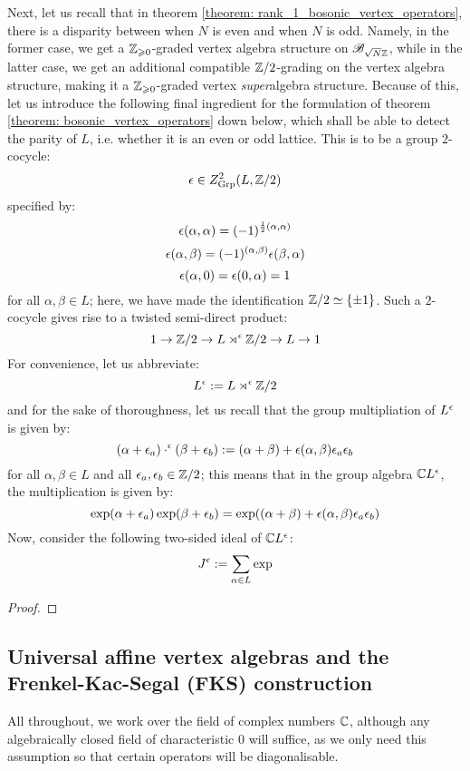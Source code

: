         Next, let us recall that in theorem \ref{theorem: rank_1_bosonic_vertex_operators}, there is a disparity between when $N$ is even and when $N$ is odd. Namely, in the former case, we get a $\mathbb{Z}_{\geqslant 0}$-graded vertex algebra structure on $\mathscr{B}_{\sqrt{N} \mathbb{Z}}$, while in the latter case, we get an additional compatible $\mathbb{Z}/2$-grading on the vertex algebra structure, making it a $\mathbb{Z}_{\geqslant 0}$-graded vertex \textit{super}algebra structure. Because of this, let us introduce the following final ingredient for the formulation of theorem \ref{theorem: bosonic_vertex_operators} down below, which shall be able to detect the parity of $L$, i.e. whether it is an even or odd lattice. This is to be a group $2$-cocycle:
            $$\epsilon \in Z^2_{\mathrm{Grp}}( L, \mathbb{Z}/2 )$$
        specified by:
            $$\epsilon(\alpha, \alpha) = (-1)^{\frac12 (\alpha, \alpha)}$$
            $$\epsilon(\alpha, \beta) = (-1)^{(\alpha, \beta)} \epsilon(\beta, \alpha)$$
            $$\epsilon(\alpha, 0) = \epsilon(0, \alpha) = 1$$
        for all $\alpha, \beta \in L$; here, we have made the identification $\mathbb{Z}/2 \simeq \{\pm 1\}$. Such a $2$-cocycle gives rise to a twisted semi-direct product:
            $$1 \to \mathbb{Z}/2 \to L \rtimes^{\epsilon} \mathbb{Z}/2 \to L \to 1$$
        For convenience, let us abbreviate:
            $$L^{\epsilon} := L \rtimes^{\epsilon} \mathbb{Z}/2$$
        and for the sake of thoroughness, let us recall that the group multipliation of $L^{\epsilon}$ is given by:
            $$(\alpha + \epsilon_a) \cdot^{\epsilon} (\beta + \epsilon_b) := (\alpha + \beta) + \epsilon(\alpha, \beta) \epsilon_a \epsilon_b$$
        for all $\alpha, \beta \in L$ and all $\epsilon_a, \epsilon_b \in \mathbb{Z}/2$; this means that in the group algebra $\mathbb{C} L^{\epsilon}$, the multiplication is given by:
            $$\exp(\alpha + \epsilon_a) \exp(\beta + \epsilon_b) = \exp( (\alpha + \beta) + \epsilon(\alpha, \beta) \epsilon_a \epsilon_b )$$
        Now, consider the following two-sided ideal of $\mathbb{C} L^{\epsilon}$:
            $$J^{\epsilon} := \sum_{\alpha \in L} \exp$$

        \begin{theorem} \label{theorem: bosonic_vertex_operators}
            
        \end{theorem}
            \begin{proof}
                
            \end{proof}

    \subsection{Universal affine vertex algebras and the Frenkel-Kac-Segal (FKS) construction}
        All throughout, we work over the field of complex numbers $\mathbb{C}$, although any algebraically closed field of characteristic $0$ will suffice, as we only need this assumption so that certain operators will be diagonalisable. 


